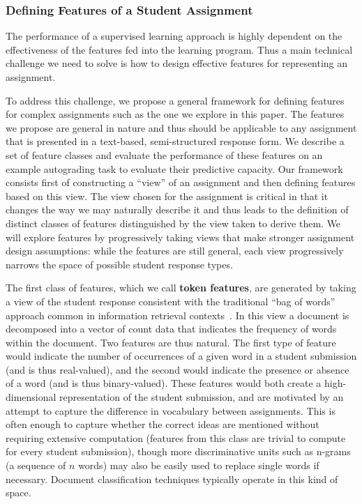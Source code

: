 \subsubsection{Defining Features of a Student Assignment}

The performance of a supervised learning approach is highly dependent on
the effectiveness of the features fed into the learning program. Thus a main technical
challenge we need to solve is how to design effective features for representing
an assignment.

To address this challenge, we propose a general framework for defining features for complex
assignments such as the one we explore in this paper. The features we
propose are general in nature and thus should be applicable to any
assignment that is presented in a text-based, semi-structured response
form. We describe a set of feature classes and evaluate the performance of
these features on an example autograding task to evaluate their predictive
capacity. Our framework consists first of constructing a ``view'' of an
assignment and then defining features based on this view. The view chosen
for the assignment is critical in that it changes the way we may naturally
describe it and thus leads to the definition of distinct classes of
features distinguished by the view taken to derive them. We will explore
features by progressively taking views that make stronger assignment design
assumptions: while the features are still general, each view progressively
narrows the space of possible student response types.

The first class of features, which we call \textbf{token features}, are
generated by taking a view of the student response consistent with the
traditional ``bag of words'' approach common in information retrieval
contexts~\cite{Manning:2008}. In this view a document is decomposed into
a vector of count data that indicates the frequency of words within the
document. Two features are thus natural. The first type of feature would
indicate the number of occurrences of a given word in a student submission
(and is thus real-valued), and the second would indicate the presence or
absence of a word (and is thus binary-valued). These features would both
create a high-dimensional representation of the student submission, and are
motivated by an attempt to capture the difference in vocabulary between
assignments. This is often enough to capture whether the correct ideas are
mentioned without requiring extensive computation (features from this class
are trivial to compute for every student submission), though more discriminative
units such as n-grams (a sequence of $n$ words) may also be easily used
to replace single words if necessary.  Document
classification techniques typically operate in this kind of space.

